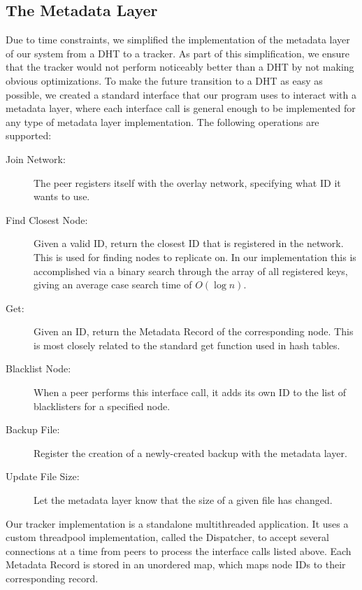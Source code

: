 \documentclass[12pt]{report}
\begin{document}
\subsection{The Metadata Layer} \label{subsec:TheMetadataLayer_sec:SystemDesign}
Due to time constraints, we simplified the implementation of the metadata layer of our system from a DHT to a tracker. As part of this simplification, we ensure that the tracker would not perform noticeably better than a DHT by not making obvious optimizations. To make the future transition to a DHT as easy as possible, we created a standard interface that our program uses to interact with a metadata layer, where each interface call is general enough to be implemented for any type of metadata layer implementation. The following operations are supported:
\begin{description}
\item[Join Network:] The peer registers itself with the overlay network, specifying what ID it wants to use.
\item[Find Closest Node:] Given a valid ID, return the closest ID that is registered in the network. This is used for finding nodes to replicate on. In our implementation this is accomplished via a binary search through the array of all registered keys, giving an average case search time of $O(\log n)$.
\item[Get:] Given an ID, return the Metadata Record of the corresponding node. This is most closely related to the standard get function used in hash tables.
\item[Blacklist Node:] When a peer performs this interface call, it adds its own ID to the list of blacklisters for a specified node.
\item[Backup File:] Register the creation of a newly-created backup with the metadata layer.
\item[Update File Size:] Let the metadata layer know that the size of a given file has changed.
\end{description}
Our tracker implementation is a standalone multithreaded application. It uses a custom threadpool implementation, called the Dispatcher, to accept several connections at a time from peers to process the interface calls listed above. Each Metadata Record is stored in an unordered map, which maps node IDs to their corresponding record.
\end{document}
